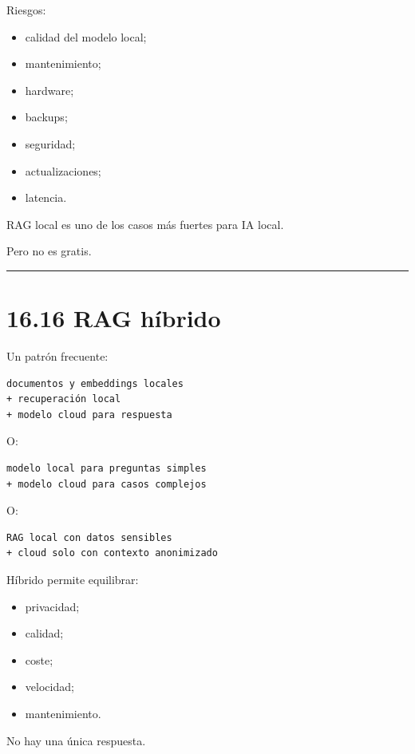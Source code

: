 Riesgos:

\begin{itemize}
\tightlist
\item
  calidad del modelo local;
\item
  mantenimiento;
\item
  hardware;
\item
  backups;
\item
  seguridad;
\item
  actualizaciones;
\item
  latencia.
\end{itemize}

RAG local es uno de los casos más fuertes para IA local.

Pero no es gratis.

\begin{center}\rule{0.5\linewidth}{0.5pt}\end{center}

\section{16.16 RAG híbrido}\label{rag-huxedbrido}

Un patrón frecuente:

\begin{lstlisting}
documentos y embeddings locales
+ recuperación local
+ modelo cloud para respuesta
\end{lstlisting}

O:

\begin{lstlisting}
modelo local para preguntas simples
+ modelo cloud para casos complejos
\end{lstlisting}

O:

\begin{lstlisting}
RAG local con datos sensibles
+ cloud solo con contexto anonimizado
\end{lstlisting}

Híbrido permite equilibrar:

\begin{itemize}
\tightlist
\item
  privacidad;
\item
  calidad;
\item
  coste;
\item
  velocidad;
\item
  mantenimiento.
\end{itemize}

No hay una única respuesta.

